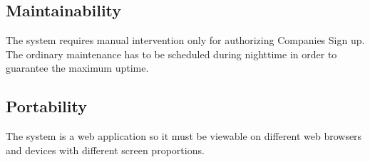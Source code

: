 \subsection{Maintainability}
The system requires manual intervention only for authorizing Companies Sign up. The ordinary maintenance has to be scheduled during nighttime in order to guarantee the maximum uptime.
\subsection{Portability}
The system is a web application so it must be viewable on different web browsers and devices with different screen proportions.